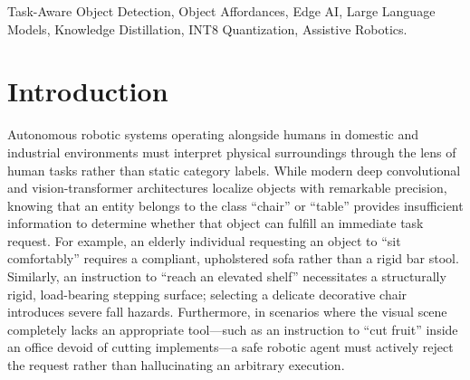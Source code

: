 \documentclass[conference]{IEEEtran}
\begin{document}
\begin{abstract}
Autonomous robotic systems operating in unconstrained human environments require the ability to select objects based on contextual affordances rather than raw categorical labels. Although contemporary object detectors identify and localize physical entities with high precision, they cannot determine an object's functional suitability for open-ended human tasks. This paper presents SCORE (Semantic and Confidence-Based Object Ranking at the Edge), an edge-deployable, training-free framework for task-aware object selection. SCORE integrates an anchor-free YOLOv8-nano detector with a dual-tier semantic reasoning architecture: an ultra-compact 35.5~KB INT8 offline affordance bank for standard objects, paired with an on-demand Large Language Model fallback via OpenRouter for open-vocabulary concepts and novel task commands. Semantic relevance is evaluated using cosine similarity over 384-dimensional Sentence-BERT embeddings and fused linearly with visual detection confidence (70/30 weighting). A dual-stage gating mechanism (similarity threshold 0.12, score threshold 0.25) reliably rejects candidate selections in negative scenes lacking actionable tools. Evaluated on the COCO-Tasks benchmark, SCORE achieves 36.2\% mAP on predicted detections and 76.8\% top-1 accuracy on ground-truth boxes---outperforming prior Gated Graph Neural Network baselines by 3.6\% while executing in 140--150~ms on commodity CPU hardware under 15~W power dissipation, completely eliminating workstation GPU dependency.
\end{abstract}

\begin{IEEEkeywords}
Task-Aware Object Detection, Object Affordances, Edge AI, Large Language Models, Knowledge Distillation, INT8 Quantization, Assistive Robotics.
\end{IEEEkeywords}

\section{Introduction}
Autonomous robotic systems operating alongside humans in domestic and industrial environments must interpret physical surroundings through the lens of human tasks rather than static category labels. While modern deep convolutional and vision-transformer architectures localize objects with remarkable precision, knowing that an entity belongs to the class ``chair'' or ``table'' provides insufficient information to determine whether that object can fulfill an immediate task request. For example, an elderly individual requesting an object to ``sit comfortably'' requires a compliant, upholstered sofa rather than a rigid bar stool. Similarly, an instruction to ``reach an elevated shelf'' necessitates a structurally rigid, load-bearing stepping surface; selecting a delicate decorative chair introduces severe fall hazards. Furthermore, in scenarios where the visual scene completely lacks an appropriate tool---such as an instruction to ``cut fruit'' inside an office devoid of cutting implements---a safe robotic agent must actively reject the request rather than hallucinating an arbitrary execution.
\end{document}
